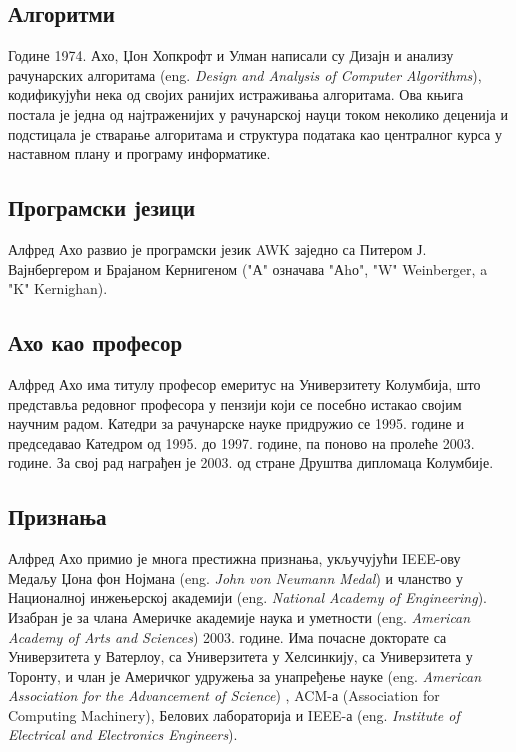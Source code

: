 \documentclass[a4paper]{article}
\begin{document}
\subsection{Алгоритми}
\label{subsec:podnaslov4}
Године 1974. Ахо, Џон Хопкрофт и Улман написали су Дизајн и анализу рачунарских алгоритама (eng. \emph{Design and Analysis of Computer Algorithms}), кодификујући нека од својих ранијих истраживања алгоритама. Ова књига постала је једна од најтраженијих у рачунарској науци током неколико деценија и подстицала је стварање алгоритама и структура података као централног курса у наставном плану и програму информатике. 

\subsection{Програмски језици}
\label{subsec:podnaslov5}
Алфред Ахо развио је програмски језик AWK заједно са Питером Ј. Вајнбергером и Брајаном Кернигеном ("А" означава "Аhо", "W" Weinberger, a "K" Kernighan). 


\subsection{Ахо као професор}
\label{subsec:podnaslov6}
Алфред Ахо има титулу професор емеритус на Универзитету Колумбија, што представља редовног професора у пензији који се посебно истакао својим научним радом. Катедри за рачунарске науке придружио се 1995. године и председавао Катедром од 1995. до 1997. године, па поново на пролеће 2003. године. За свој рад награђен је 2003. од стране Друштва дипломаца Колумбије. 

\subsection{Признања}
\label{subsec:podnaslov7}
Алфред Ахо примио је многа престижна признања, укључујући IEEE-ову Медаљу Џона фон Нојмана (eng. \emph {John von Neumann Medal}) и чланство у Националној инжењерској академији (eng. \emph {National Academy of Engineering}). Изабран је за члана Америчке академије наука и уметности (eng. \emph {American Academy of Arts and Sciences}) 2003. године. Има почасне докторате са Универзитета у Ватерлоу, са Универзитета у Хелсинкију, са Универзитета у Торонту, и члан је Америчког удружења за унапређење науке (eng. \emph{American Association for the Advancement of Science}) , ACM-а (Association for Computing Machinery), Белових лабораторија и IEEE-а (eng. \emph {Institute of Electrical and Electronics Engineers}). 
\end{document}
